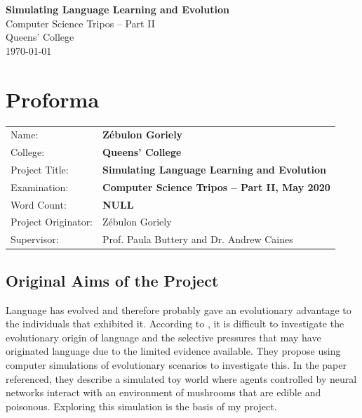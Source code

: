 \documentclass[12pt,a4paper,twoside,openright]{report}
\begin{document}


\pagestyle{empty}


\vspace*{60mm}
\begin{center}
\Huge
\textbf{Simulating Language Learning and Evolution} \\[5mm]
Computer Science Tripos -- Part II \\[5mm]
Queens' College \\[5mm]
\today  %
\end{center}


\pagestyle{plain}

\chapter*{Proforma}

{\large
\begin{tabular}{ll}
Name:               & \bf Z\'ebulon Goriely                       \\
College:            & \bf Queens' College                     \\
Project Title:      & \bf Simulating Language Learning and Evolution \\
Examination:        & \bf Computer Science Tripos -- Part II, May 2020  \\
Word Count:         & \bf NULL\footnotemark[1]  \\
Project Originator: & Z\'ebulon Goriely                    \\
Supervisor:         & Prof. Paula Buttery and Dr. Andrew Caines                  \\ 
\end{tabular}
}


\section*{Original Aims of the Project}

Language has evolved and therefore probably gave an evolutionary advantage to the individuals that exhibited it. According to \citet{Cangelosi1998}, it is difficult to investigate the evolutionary origin of language and the selective pressures that may have originated language due to the limited evidence available. They propose using computer simulations of evolutionary scenarios to investigate this. In the paper referenced, they describe a simulated toy world where agents controlled by neural networks interact with an environment of mushrooms that are edible and poisonous. Exploring this simulation is the basis of my project.
\end{document}
